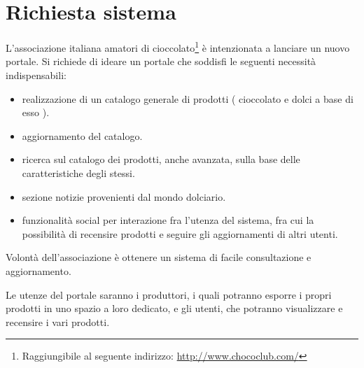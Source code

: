 \chapter{Richiesta sistema}

L’associazione italiana amatori di cioccolato\footnote{Raggiungibile al seguente indirizzo: \url{http://www.chococlub.com/}} è intenzionata a lanciare un nuovo portale.
Si richiede di ideare un portale che soddisfi le seguenti necessità indispensabili:
\begin{itemize}
    \item realizzazione di un catalogo generale di prodotti ( cioccolato e dolci a base di esso ).
    \item aggiornamento del catalogo.
    \item ricerca sul catalogo dei prodotti, anche avanzata, sulla base delle caratteristiche degli stessi.
    \item sezione notizie provenienti dal mondo dolciario.
    \item funzionalità social per interazione fra l'utenza del sistema, fra cui la possibilità di recensire prodotti e seguire gli aggiornamenti di altri utenti.
\end{itemize}
Volontà dell'associazione è ottenere un sistema di facile consultazione e aggiornamento.

Le utenze del portale saranno i produttori, i quali potranno esporre i propri prodotti in uno spazio a loro dedicato, e gli utenti, che potranno visualizzare e recensire i vari prodotti.
